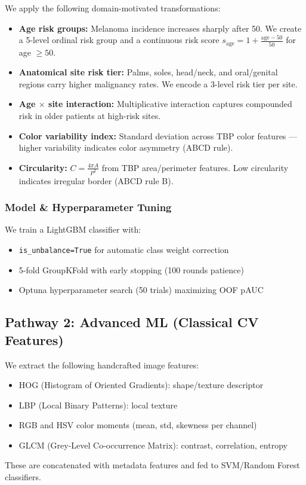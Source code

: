 \documentclass[12pt, a4paper]{article}
\begin{document}
We apply the following domain-motivated transformations:
\begin{itemize}
    \item \textbf{Age risk groups:} Melanoma incidence increases sharply after 50.
          We create a 5-level ordinal risk group and a continuous risk score
          $s_{\text{age}} = 1 + \frac{\text{age} - 50}{50}$ for age $\geq 50$.
    \item \textbf{Anatomical site risk tier:} Palms, soles, head/neck, and
          oral/genital regions carry higher malignancy rates.
          We encode a 3-level risk tier per site.
    \item \textbf{Age $\times$ site interaction:} Multiplicative interaction
          captures compounded risk in older patients at high-risk sites.
    \item \textbf{Color variability index:} Standard deviation across TBP
          color features — higher variability indicates color asymmetry (ABCD rule).
    \item \textbf{Circularity:} $C = \frac{4\pi A}{P^2}$ from TBP area/perimeter
          features. Low circularity indicates irregular border (ABCD rule B).
\end{itemize}

\subsubsection{Model \& Hyperparameter Tuning}

We train a LightGBM classifier \citep{ke2017lightgbm} with:
\begin{itemize}
    \item \texttt{is\_unbalance=True} for automatic class weight correction
    \item 5-fold GroupKFold with early stopping (100 rounds patience)
    \item Optuna \citep{akiba2019optuna} hyperparameter search (50 trials)
          maximizing OOF pAUC
\end{itemize}

\subsection{Pathway 2: Advanced ML (Classical CV Features)}

We extract the following handcrafted image features:
\begin{itemize}
    \item HOG (Histogram of Oriented Gradients): shape/texture descriptor
    \item LBP (Local Binary Patterns): local texture
    \item RGB and HSV color moments (mean, std, skewness per channel)
    \item GLCM (Grey-Level Co-occurrence Matrix): contrast, correlation, entropy
\end{itemize}
These are concatenated with metadata features and fed to SVM/Random Forest classifiers.
\end{document}
